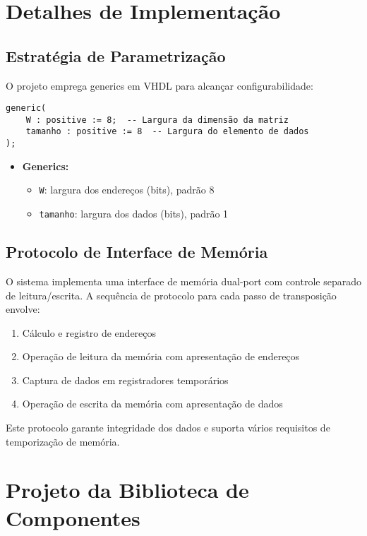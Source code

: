 \documentclass[conference]{IEEEtran}
\begin{document}
\section{Detalhes de Implementação}

\subsection{Estratégia de Parametrização}

O projeto emprega generics em VHDL para alcançar configurabilidade:
\begin{lstlisting}[style=vhdl]
generic(
    W : positive := 8;  -- Largura da dimensão da matriz
    tamanho : positive := 8  -- Largura do elemento de dados
);
\end{lstlisting}

\begin{itemize}
\item \textbf{Generics:}
\begin{itemize}
\item \texttt{W}: largura dos endereços (bits), padrão 8
\item \texttt{tamanho}: largura dos dados (bits), padrão 1
\end{itemize}
\end{itemize}

\subsection{Protocolo de Interface de Memória}

O sistema implementa uma interface de memória dual-port com controle separado de leitura/escrita. A sequência de protocolo para cada passo de transposição envolve:

\begin{enumerate}
\item Cálculo e registro de endereços
\item Operação de leitura da memória com apresentação de endereços
\item Captura de dados em registradores temporários
\item Operação de escrita da memória com apresentação de dados
\end{enumerate}

Este protocolo garante integridade dos dados e suporta vários requisitos de temporização de memória.

\section{Projeto da Biblioteca de Componentes}
\end{document}
